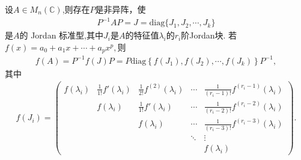 \documentclass[../../main.tex]{subfiles}
\begin{document}
\begin{proposition}
设$A\in M_n(\mathbb{C})$,则存在\(P\)是非异阵，使
\begin{align*}
P^{-1}AP = J = \mathrm{diag}\{J_1,J_2,\cdots,J_k\}
\end{align*}
是\(A\)的 Jordan 标准型,其中$J_i$是$A$的特征值$\lambda_i$的$r_i$阶Jordan块.
若$f(x)=a_0+a_1x+\cdots+a_px^p,$则
\begin{align*}
f(A)=P^{-1}f(J)P=P\mathrm{diag}\left\{ f\left( J_1 \right) ,f\left( J_2 \right) ,\cdots ,f\left( J_k \right) \right\} P^{-1},
\end{align*}
其中
\begin{align*}
f(J_i)= \begin{pmatrix}
f(\lambda_i) & \frac{1}{1!}f'(\lambda_i) & \frac{1}{2!}f^{(2)}(\lambda_i) & \cdots & \frac{1}{(r_i - 1)!}f^{(r_i - 1)}(\lambda_i) \\
& f(\lambda_i) & \frac{1}{1!}f'(\lambda_i) & \cdots & \frac{1}{(r_i - 2)!}f^{(r_i - 2)}(\lambda_i) \\
& & f(\lambda_i) & \cdots & \frac{1}{(r_i - 3)!}f^{(r_i - 3)}(\lambda_i) \\
& & & \ddots & \vdots \\
& & & & f(\lambda_i)
\end{pmatrix}. 
\end{align*}
\end{proposition}
\end{document}
